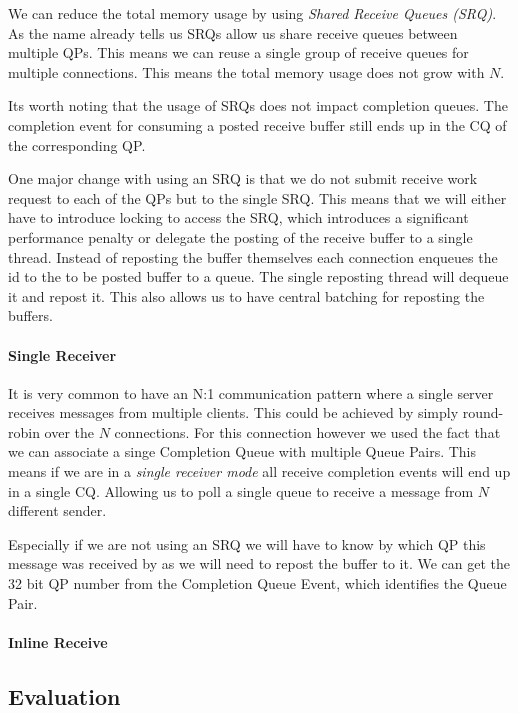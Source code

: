 We can reduce the total memory usage by using \emph{Shared Receive Queues (SRQ)}. As the name already tells us SRQs allow us
share receive queues between multiple QPs. This means we can reuse a single group of receive queues for multiple connections.
This means the total memory usage does not grow with $N$.

Its worth noting that the usage of SRQs does not impact completion queues. The completion event for consuming a posted receive
buffer still ends up in the CQ of the corresponding QP.

One major change with using an SRQ is that we do not submit receive work request to each of the QPs but to the single SRQ. This
means that we will either have to introduce locking to access the SRQ, which introduces a significant performance penalty or 
delegate the posting of the receive buffer to a single thread. Instead of reposting the buffer themselves each connection 
enqueues the id to the to be posted buffer to a queue. The single reposting thread will dequeue it and repost it. This also
allows us to have central batching for reposting the buffers.

\paragraph{Single Receiver} It is very common to have an N:1 communication pattern where a single server receives messages 
from multiple clients. This could be achieved by simply round-robin over the $N$ connections. For this connection however 
we used the fact that we can associate a singe Completion Queue with multiple Queue Pairs. This means if we are in a
\emph{single receiver mode} all receive completion events will end up in a single CQ. Allowing us to poll a single queue to
receive a message from $N$ different sender.

Especially if we are not using an SRQ we will have to know by which QP this message was received by as we will need to repost
the buffer to it. We can get the 32 bit QP number from the Completion Queue Event, which identifies the Queue Pair. 

\paragraph{Inline Receive} 

\subsection{Evaluation}

